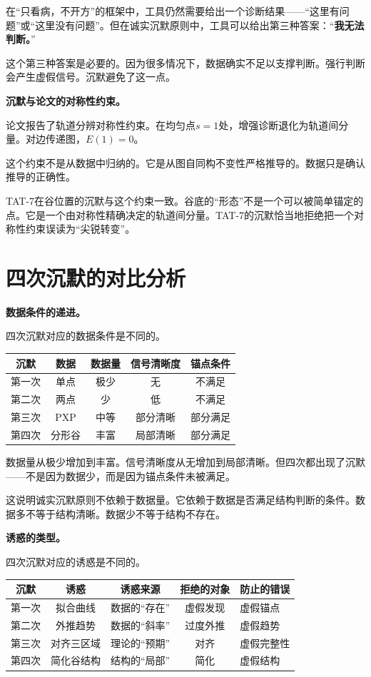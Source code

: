 \documentclass[11pt,a4paper]{book}
\theoremstyle{definition}
\begin{document}
在“只看病，不开方”的框架中，工具仍然需要给出一个诊断结果——“这里有问题”或“这里没有问题”。但在诚实沉默原则中，工具可以给出第三种答案：“\textbf{我无法判断。}”

这个第三种答案是必要的。因为很多情况下，数据确实不足以支撑判断。强行判断会产生虚假信号。沉默避免了这一点。

\textbf{沉默与论文的对称性约束。}

论文报告了轨道分辨对称性约束。在均匀点$s=1$处，增强诊断退化为轨道间分量。对边传递图，$E(1)=0$。

这个约束不是从数据中归纳的。它是从图自同构不变性严格推导的。数据只是确认推导的正确性。

TAT-7在谷位置的沉默与这个约束一致。谷底的“形态”不是一个可以被简单锚定的点。它是一个由对称性精确决定的轨道间分量。TAT-7的沉默恰当地拒绝把一个对称性约束误读为“尖锐转变”。

\section{四次沉默的对比分析}

\textbf{数据条件的递进。}

四次沉默对应的数据条件是不同的。

\begin{table}[h]
\centering
\begin{tabular}{ccccc}
\toprule
沉默 & 数据 & 数据量 & 信号清晰度 & 锚点条件 \\
\midrule
第一次 & 单点 & 极少 & 无 & 不满足 \\
第二次 & 两点 & 少 & 低 & 不满足 \\
第三次 & PXP & 中等 & 部分清晰 & 部分满足 \\
第四次 & 分形谷 & 丰富 & 局部清晰 & 部分满足 \\
\bottomrule
\end{tabular}
\end{table}

数据量从极少增加到丰富。信号清晰度从无增加到局部清晰。但四次都出现了沉默——不是因为数据少，而是因为锚点条件未被满足。

这说明诚实沉默原则不依赖于数据量。它依赖于数据是否满足结构判断的条件。数据多不等于结构清晰。数据少不等于结构不存在。

\textbf{诱惑的类型。}

四次沉默对应的诱惑是不同的。

\begin{table}[h]
\centering
\begin{tabular}{cccc}
\toprule
沉默 & 诱惑 & 诱惑来源 & 拒绝的对象 & 防止的错误 \\
\midrule
第一次 & 拟合曲线 & 数据的“存在” & 虚假发现 & 虚假锚点 \\
第二次 & 外推趋势 & 数据的“斜率” & 过度外推 & 虚假趋势 \\
第三次 & 对齐三区域 & 理论的“预期” & 对齐 & 虚假完整性 \\
第四次 & 简化谷结构 & 结构的“局部” & 简化 & 虚假结构 \\
\bottomrule
\end{tabular}
\end{table}
\end{document}
